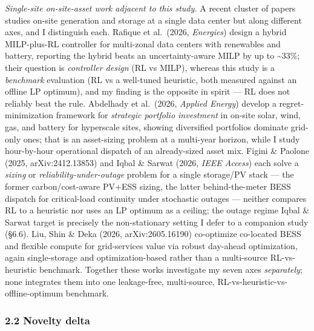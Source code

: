 \documentclass[
  11pt,
]{article}
\newcounter{none} %
\begin{document}
\emph{Single-site on-site-asset work adjacent to this study.} A recent
cluster of papers studies on-site generation and storage at a single
data center but along different axes, and I distinguish each. Rafique et
al.~(2026, \emph{Energies}) design a hybrid MILP-plus-RL controller for
multi-zonal data centers with renewables and battery, reporting the
hybrid beats an uncertainty-aware MILP by up to \textasciitilde33\%;
their question is \emph{controller design} (RL vs MILP), whereas this
study is a \emph{benchmark} evaluation (RL vs a well-tuned heuristic,
both measured against an offline LP optimum), and my finding is the
opposite in spirit --- RL does not reliably beat the rule. Abdelhady et
al.~(2026, \emph{Applied Energy}) develop a regret-minimization
framework for \emph{strategic portfolio investment} in on-site solar,
wind, gas, and battery for hyperscale sites, showing diversified
portfolios dominate grid-only ones; that is an asset-sizing problem at a
multi-year horizon, while I study hour-by-hour operational dispatch of
an already-sized asset mix. Figini \& Paolone (2025, arXiv:2412.13853)
and Iqbal \& Sarwat (2026, \emph{IEEE Access}) each solve a
\emph{sizing} or \emph{reliability-under-outage} problem for a single
storage/PV stack --- the former carbon/cost-aware PV+ESS sizing, the
latter behind-the-meter BESS dispatch for critical-load continuity under
stochastic outages --- neither compares RL to a heuristic nor uses an LP
optimum as a ceiling; the outage regime Iqbal \& Sarwat target is
precisely the non-stationary setting I defer to a companion study
(§6.6). Liu, Shin \& Deka (2026, arXiv:2605.16190) co-optimize
co-located BESS and flexible compute for grid-services value via robust
day-ahead optimization, again single-storage and optimization-based
rather than a multi-source RL-vs-heuristic benchmark. Together these
works investigate my seven axes \emph{separately}; none integrates them
into one leakage-free, multi-source, RL-vs-heuristic-vs-offline-optimum
benchmark.

\subsubsection{2.2 Novelty delta}\label{novelty-delta}
\end{document}
